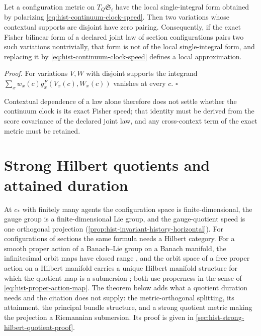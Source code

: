 Let a configuration metric on \(T_Q\mathfrak S_i\) have the local single-integral
form obtained by polarizing \eqref{eq:hist-continuum-clock-speed}. Then two
variations whose contextual supports are disjoint have zero pairing.
Consequently, if the exact Fisher bilinear form of a declared joint law of
section configurations pairs two such variations nontrivially, that form is not
of the local single-integral form, and replacing it by
\eqref{eq:hist-continuum-clock-speed} defines a local approximation.

\noindent\emph{Proof.}
For variations \(V,W\) with disjoint supports the integrand
\(\sum_xw_x(c)g^F_x(V_x(c),W_x(c))\) vanishes at every \(c\). \(\square\)

Contextual dependence of a law alone therefore does not settle whether the
continuum clock is its exact Fisher speed; that identity must be derived from
the score covariance of the declared joint law, and any cross-context term of the
exact metric must be retained.

\section{Strong Hilbert quotients and attained duration}
\label{sec:hist-strong-hilbert-quotient}

At \(c_*\) with finitely many agents the configuration space is
finite-dimensional, the gauge group is a finite-dimensional Lie group, and the
gauge-quotient speed is one orthogonal projection
(\cref{prop:hist-invariant-history-horizontal}). For configurations of sections
the same formula needs a Hilbert category. For a smooth proper action of a
Banach--Lie group on a Banach manifold, the infinitesimal orbit maps have closed
range \citep[Theorem~2.1]{JotzNeeb2008}, and the orbit space of a free proper
action on a Hilbert manifold carries a unique Hilbert manifold structure for
which the quotient map is a submersion \citep[Corollary~2.5]{JotzNeeb2008}; both
use properness in the sense of \eqref{eq:hist-proper-action-map}. The theorem
below adds what a quotient duration needs and the citation does not supply: the
metric-orthogonal splitting, its attainment, the principal bundle structure,
and a strong quotient metric making the projection a Riemannian submersion. Its
proof is given in \cref{sec:hist-strong-hilbert-quotient-proof}.

